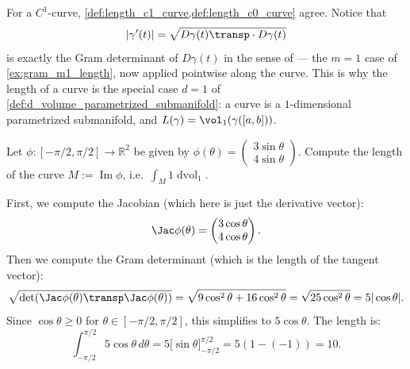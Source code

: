 \begin{center}
\end{center}

\begin{remark}
For a $C^1$-curve, \cref{def:length_c1_curve,def:length_c0_curve} agree. Notice that
\[\lvert\gamma'(t)\rvert = \sqrt{D\gamma(t)\transp \cdot D\gamma(t)}\]
is exactly the Gram determinant of $D\gamma(t)$ in the sense of
 --- the $m=1$ case of \cref{ex:gram_m1_length}, now
applied pointwise along the curve. This is why the length of a curve is the special case
$d=1$ of \cref{def:d_volume_parametrized_submanifold}: a curve is a $1$-dimensional
parametrized submanifold, and $L(\gamma) = \vol_1(\gamma([a,b]))$.
\end{remark}

\begin{example}
\label{ex:line_integral}
Let $\phi : [-\pi/2, \pi/2] \to \mathbb{R}^2$ be given by $\phi(\theta) = \begin{pmatrix} 3\sin\theta \\ 4\sin\theta \end{pmatrix}$.
Compute the length of the curve $M := \operatorname{Im}\phi$, i.e.\ $\int_M 1 \mathop{d\text{vol}}_1$.

First, we compute the Jacobian (which here is just the derivative vector):
\[\Jac\phi(\theta) = \begin{pmatrix} 3\cos\theta \\ 4\cos\theta \end{pmatrix}.\]
Then we compute the Gram determinant (which is the length of the tangent vector):
\[\sqrt{\det(\Jac\phi(\theta)\transp \Jac\phi(\theta))} = \sqrt{9\cos^2\theta + 16\cos^2\theta} = \sqrt{25\cos^2\theta} = 5|\cos\theta|.\]
Since $\cos\theta \geq 0$ for $\theta \in [-\pi/2, \pi/2]$, this simplifies to $5\cos\theta$.
The length is:
\[\int_{-\pi/2}^{\pi/2} 5\cos\theta \,d\theta = 5\big[\sin\theta\big]_{-\pi/2}^{\pi/2} = 5(1 - (-1)) = 10.\]
\end{example}

